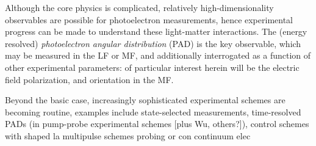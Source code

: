 Although the core physics is complicated, relatively high-dimensionality observables are possible for photoelectron measurements, hence experimental progress can be made to understand these light-matter interactions. The (energy resolved) \textit{photoelectron angular distribution} (PAD) is the key observable, which may be measured in the LF or MF, and additionally interrogated as a function of other experimental parameters: of particular interest herein will be the electric field polarization, and orientation in the MF. 

Beyond the basic case, increasingly sophisticated experimental schemes are becoming routine, examples include state-selected measurements, time-resolved PADs (in pump-probe experimental schemes \cite{Seideman2002} [plus Wu, others?]), control schemes with shaped la
multipulse schemes probing or con continuum elec

